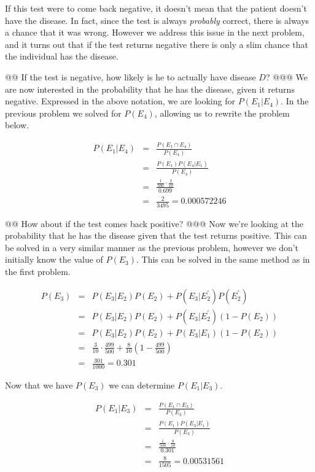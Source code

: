 \documentclass[10pt]{article}
\begin{document}
\begin{easylist}[enumerate]
    If this test were to come back negative, it doesn't mean that the patient doesn't have the disease. In fact, since
    the test is always \textit{probably} correct, there is always a chance that it was wrong. However we address this
    issue in the next problem, and it turns out that if the test returns negative there is only a slim chance that the
    individual has the disease.

    @@ If the test is negative, how likely is he to actually have disease $D$?
    @@@ We are now interested in the probability that he has the disease, given it returns negative. Expressed in the
    above notation, we are looking for $P(E_1|E_4)$. In the previous problem we solved for $P(E_4)$, allowing us to
    rewrite the problem below.

        \[\begin{aligned}
            P(E_1|E_4) &=& \frac{P(E_1 \cap E_4)}{P(E_4)}\\
                       &=& \frac{P(E_1)P(E_4|E_1)}{P(E_4)}\\
                       &=& \frac{\frac{1}{500} \cdot \frac{2}{10} }{0.699}\\
                       &=& \frac{2}{3495} = \boxed{0.000572246}
        \end{aligned}\]

    @@ How about if the test comes back positive?
    @@@ Now we're looking at the probability that he has the disease given that the test returns positive. This can be
    solved in a very similar manner as the previous problem, however we don't initially know the value of $P(E_3)$. This
    can be solved in the same method as in the first problem.

        \[ \begin{aligned}
            P(E_3) &=& P(E_3|E_2)P(E_2) + P(E_3|E^\prime_2)P(E^\prime_2)\\
                   &=& P(E_3|E_2)P(E_2) + P(E_3|E^\prime_2)(1 - P(E_2))\\
                   &=& P(E_3|E_2)P(E_2) + P(E_3|E_1)(1 - P(E_2))\\
                   &=& \frac{3}{10} \cdot \frac{499}{500} + \frac{8}{10} \left( 1 - \frac{499}{500} \right)\\
                   &=& \frac{301}{1000} = \boxed{0.301}
        \end{aligned} \]

        Now that we have $P(E_3)$ we can determine $P(E_1|E_3)$.

        \[\begin{aligned}
            P(E_1|E_3) &=& \frac{P(E_1 \cap E_3)}{P(E_3)}\\
                       &=& \frac{P(E_1)P(E_3|E_1)}{P(E_3)}\\
                       &=& \frac{\frac{1}{500} \cdot \frac{8}{10} }{0.301}\\
                       &=& \frac{8}{1505} = \boxed{0.00531561}
        \end{aligned}\]


\end{easylist}
\end{document}
